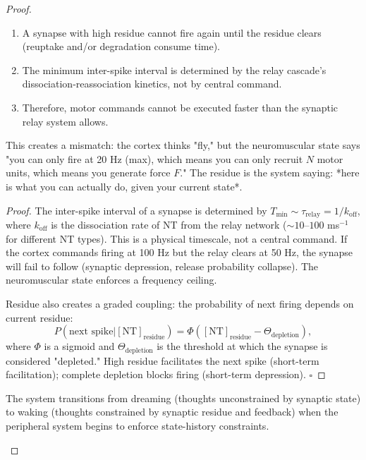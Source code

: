 \begin{corollary}
\begin{proof}
\begin{theorem}
\begin{enumerate}[label=(\roman*), noitemsep]
\item A synapse with high residue cannot fire again until the residue clears (reuptake and/or degradation consume time).
\item The minimum inter-spike interval is determined by the relay cascade's dissociation-reassociation kinetics, not by central command.
\item Therefore, motor commands cannot be executed faster than the synaptic relay system allows.
\end{enumerate}

This creates a mismatch: the cortex thinks "fly," but the neuromuscular state says "you can only fire at 20 Hz (max), which means you can only recruit $N$ motor units, which means you generate force $F$." The residue is the system saying: *here is what you can actually do, given your current state*.
\end{theorem}

\begin{proof}
The inter-spike interval of a synapse is determined by $T_{\text{min}} \sim \tau_{\text{relay}} = 1/k_{\text{off}}$, where $k_{\text{off}}$ is the dissociation rate of NT from the relay network ($\sim 10$--$100$ ms$^{-1}$ for different NT types). This is a physical timescale, not a central command. If the cortex commands firing at 100 Hz but the relay clears at 50 Hz, the synapse will fail to follow (synaptic depression, release probability collapse). The neuromuscular state enforces a frequency ceiling.

Residue also creates a graded coupling: the probability of next firing depends on current residue:
\begin{equation}
  P(\text{next spike}|[\text{NT}]_{\text{residue}}) = \Phi([\text{NT}]_{\text{residue}} - \Theta_{\text{depletion}}),
\end{equation}
where $\Phi$ is a sigmoid and $\Theta_{\text{depletion}}$ is the threshold at which the synapse is considered "depleted." High residue facilitates the next spike (short-term facilitation); complete depletion blocks firing (short-term depression). $\square$
\end{proof}

\begin{principle}
\label{prin:consciousness-reality}
The system transitions from dreaming (thoughts unconstrained by synaptic state) to waking (thoughts constrained by synaptic residue and feedback) when the peripheral system begins to enforce state-history constraints.


\end{principle}
\end{proof}
\end{corollary}
